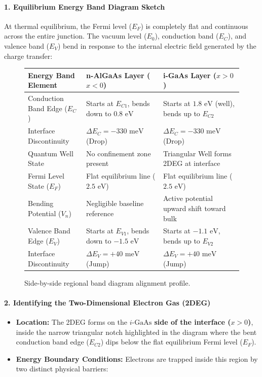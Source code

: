 \documentclass[
]{article}
\providecommand{\tightlist}{%
  \setlength{\itemsep}{0pt}\setlength{\parskip}{0pt}}
\begin{document}
\paragraph{1. Equilibrium Energy Band Diagram
Sketch}\label{equilibrium-energy-band-diagram-sketch}

At thermal equilibrium, the Fermi level (\(E_F\)) is completely flat and
continuous across the entire junction. The vacuum level (\(E_0\)),
conduction band (\(E_C\)), and valence band (\(E_V\)) bend in response
to the internal electric field generated by the charge transfer:
\begin{figure}[h!]
\centering
\renewcommand{\arraystretch}{1.4}
\begin{tabular}{|l|l|l|}
\hline
\textbf{Energy Band Element} & \textbf{n-AlGaAs Layer ($x < 0$)} & \textbf{i-GaAs Layer ($x > 0$)} \\ \hline
Conduction Band Edge ($E_C$) & Starts at $E_{C1}$, bends down to $0.8\text{ eV}$ & Starts at $1.8\text{ eV}$ (well), bends up to $E_{C2}$ \\ \hline
Interface Discontinuity & $\Delta E_C = -330\text{ meV}$ (Drop) & $\Delta E_C = -330\text{ meV}$ (Drop) \\ \hline
Quantum Well State & No confinement zone present & Triangular Well forms 2DEG at interface \\ \hline
Fermi Level State ($E_F$) & Flat equilibrium line ($2.5\text{ eV}$) & Flat equilibrium line ($2.5\text{ eV}$) \\ \hline
Bending Potential ($V_n$) & Negligible baseline reference & Active potential upward shift toward bulk \\ \hline
Valence Band Edge ($E_V$) & Starts at $E_{V1}$, bends down to $-1.5\text{ eV}$ & Starts at $-1.1\text{ eV}$, bends up to $E_{V2}$ \\ \hline
Interface Discontinuity & $\Delta E_V = +40\text{ meV}$ (Jump) & $\Delta E_V = +40\text{ meV}$ (Jump) \\ \hline
\end{tabular}
\caption{Side-by-side regional band diagram alignment profile.}
\end{figure}

\paragraph{2. Identifying the Two-Dimensional Electron Gas
(2DEG)}\label{identifying-the-two-dimensional-electron-gas-2deg}

\begin{itemize}
\tightlist
\item
  \textbf{Location:} The 2DEG forms on the \textbf{\(i\text{-GaAs}\)
  side of the interface (\(x > 0\))}, inside the narrow triangular notch
  highlighted in the diagram where the bent conduction band edge
  (\(E_{C2}\)) dips below the flat equilibrium Fermi level (\(E_F\)).
\item
  \textbf{Energy Boundary Conditions:} Electrons are trapped inside this
  region by two distinct physical barriers:
\end{itemize}
\end{document}
